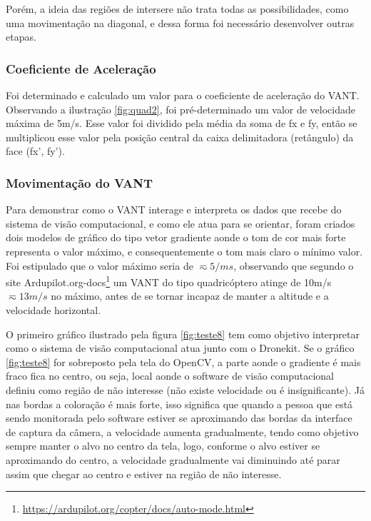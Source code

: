 Porém, a ideia das regiões de intersere não trata todas as possibilidades, como uma movimentação na diagonal, e dessa forma foi necessário desenvolver outras etapas.

\subsubsection{Coeficiente de Aceleração}

Foi determinado e calculado um valor para o coeficiente de aceleração do VANT. Observando a ilustração \ref{fig:quad2}, foi pré-determinado um valor de velocidade máxima de 5m/s. Esse valor foi dividido pela média da soma de fx e fy, então se multiplicou esse valor pela posição central da caixa delimitadora (retângulo) da face (fx', fy'). 

\subsubsection{Movimentação do VANT}

Para demonstrar como o VANT interage e interpreta os dados que recebe do sistema de visão computacional, e como ele atua para se orientar, foram criados dois modelos de gráfico do tipo vetor gradiente aonde o tom de cor mais forte representa o valor máximo, e consequentemente o tom mais claro o mínimo valor. Foi estipulado que o valor máximo seria de $\displaystyle \eqsim 5/ms$, observando que segundo o site Ardupilot.org-docs\footnote{\url{https://ardupilot.org/copter/docs/auto-mode.html}} um VANT do tipo quadricóptero atinge de 10m/s $\displaystyle \eqsim13m/s$ no máximo, antes de se tornar incapaz de manter a altitude e a velocidade horizontal. 

O primeiro gráfico ilustrado pela figura \ref{fig:teste8} tem como objetivo interpretar como o sistema de visão computacional atua junto com o Dronekit. Se o gráfico \ref{fig:teste8} for sobreposto pela tela do OpenCV, a parte aonde o gradiente é mais fraco fica no centro, ou seja, local aonde o software de visão computacional definiu como região de não interesse (não existe velocidade ou é insignificante). 
Já nas bordas a coloração é mais forte, isso significa que quando a pessoa que está sendo monitorada pelo software estiver se aproximando  das bordas da interface de captura da câmera, a velocidade aumenta gradualmente, tendo como objetivo sempre manter o alvo no centro da tela, logo, conforme o alvo estiver se aproximando do centro, a velocidade gradualmente vai diminuindo até parar assim que chegar ao centro e estiver na região de não interesse.

